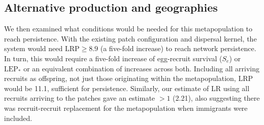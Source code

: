 \documentclass[12pt, oneside]{article}   	%
\begin{document}


\subsection*{Alternative production and geographies}

We then examined what conditions would be needed for this metapopulation to reach persistence. With the existing patch configuration and dispersal kernel, the system would need $\text{LRP} \geq 8.9$ (a five-fold increase) to reach network persistence. In turn, this would require a five-fold increase of egg-recruit survival ($S_e$) or $\text{LEP}_*$ or an equivalent combination of increases across both. Including all arriving recruits as offspring, not just those originating within the metapopulation, LRP would be 11.1, sufficient for persistence. Similarly, our estimate of LR using all recruits arriving to the patches gave an estimate $> 1$ (2.21), also suggesting there was recruit-recruit replacement for the metapopulation when immigrants were included. 
\end{document}
